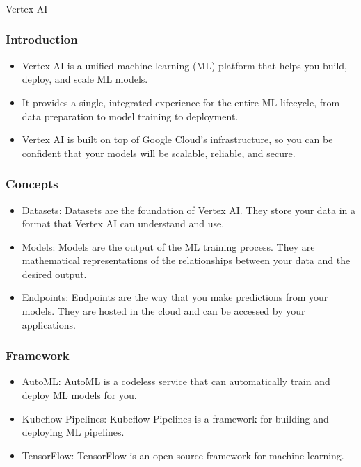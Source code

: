 \begin{frame}[fragile]\frametitle{}
\begin{center}
{\Large Vertex AI}
\end{center}
\end{frame}

\begin{frame}[fragile]\frametitle{Introduction}

\begin{itemize}
\item Vertex AI is a unified machine learning (ML) platform that helps you build, deploy, and scale ML models.
\item It provides a single, integrated experience for the entire ML lifecycle, from data preparation to model training to deployment.
\item Vertex AI is built on top of Google Cloud's infrastructure, so you can be confident that your models will be scalable, reliable, and secure.
\end{itemize}
\end{frame}

\begin{frame}[fragile]\frametitle{Concepts}

\begin{itemize}
\item Datasets: Datasets are the foundation of Vertex AI. They store your data in a format that Vertex AI can understand and use.
\item Models: Models are the output of the ML training process. They are mathematical representations of the relationships between your data and the desired output.
\item Endpoints: Endpoints are the way that you make predictions from your models. They are hosted in the cloud and can be accessed by your applications.
\end{itemize}
\end{frame}

\begin{frame}[fragile]\frametitle{Framework}

\begin{itemize}
\item AutoML: AutoML is a codeless service that can automatically train and deploy ML models for you.
\item Kubeflow Pipelines: Kubeflow Pipelines is a framework for building and deploying ML pipelines.
\item TensorFlow: TensorFlow is an open-source framework for machine learning.
\end{itemize}
\end{frame}

